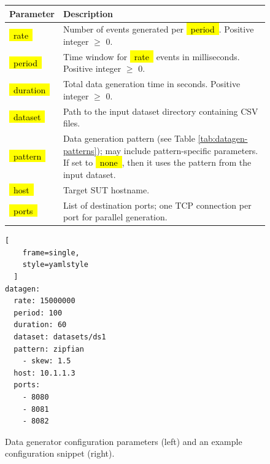 \documentclass[runningheads]{llncs}
\newcommand*{\codebox}[1]{{\ttfamily\hyphenchar\font=45\relax\hl{~#1~}}}
\begin{document}
\begin{figure}
\centering

\begin{minipage}[t]{0.65\linewidth}
  \vspace{0pt}
  \scriptsize
        \setlength{\tabcolsep}{4pt}
        \renewcommand{\arraystretch}{1.15}
        \begin{tabularx}{\linewidth}{@{}lX@{}}
            \toprule
            \textbf{Parameter} & \textbf{Description} \\
            \midrule
            \codebox{rate}     & Number of events generated per \codebox{period}. Positive integer $\geq$ 0. \\
            \codebox{period}   & Time window for \codebox{rate} events in milliseconds. Positive integer $\geq$ 0. \\
            \codebox{duration} & Total data generation time in seconds. Positive integer $\geq$ 0. \\
            \codebox{dataset}  & Path to the input dataset directory containing CSV files. \\
            \codebox{pattern}  & Data generation pattern (see Table \ref{tab:datagen-patterns}); may include pattern-specific parameters. If set to \codebox{none}, then it uses the pattern from the input dataset. \\
            \codebox{host}     & Target SUT hostname. \\
            \codebox{ports}    & List of destination ports; one TCP connection per port for parallel generation. \\
            \bottomrule
        \end{tabularx}
\end{minipage}
\hfill
\begin{minipage}[t]{0.32\linewidth}
  \vspace{15pt}
  \scriptsize
  \begin{lstlisting}[
    frame=single,
    style=yamlstyle
  ]
datagen:
  rate: 15000000
  period: 100
  duration: 60
  dataset: datasets/ds1
  pattern: zipfian
    - skew: 1.5
  host: 10.1.1.3
  ports:
    - 8080
    - 8081
    - 8082
  \end{lstlisting}
\end{minipage}

\caption{Data generator configuration parameters (left) and an example configuration snippet (right).}
\label{lst:datagen}
\end{figure}
\end{document}
